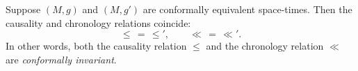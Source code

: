 Suppose $(M, g)$ and $(M, g')$ are conformally equivalent space-times. Then the causality and chronology relations coincide:
$$\leq \,=\, \leq', \qquad \ll \,=\, \ll'.$$
In other words, both the causality relation $\leq$ and the chronology relation $\ll$ are \emph{conformally invariant}.
